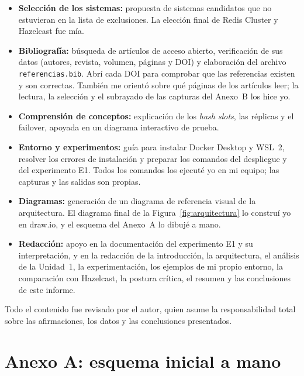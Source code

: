 \documentclass[11pt,a4paper]{article}
\begin{document}
\begin{itemize}
  \item \textbf{Selección de los sistemas:} propuesta de sistemas candidatos
  que no estuvieran en la lista de exclusiones. La elección final de Redis
  Cluster y Hazelcast fue mía.
  \item \textbf{Bibliografía:} búsqueda de artículos de acceso abierto,
  verificación de sus datos (autores, revista, volumen, páginas y DOI) y
  elaboración del archivo \texttt{referencias.bib}. Abrí cada DOI para
  comprobar que las referencias existen y son correctas. También me orientó
  sobre qué páginas de los artículos leer; la lectura, la selección y el
  subrayado de las capturas del Anexo~B los hice yo.
  \item \textbf{Comprensión de conceptos:} explicación de los \emph{hash
  slots}, las réplicas y el failover, apoyada en un diagrama interactivo de
  prueba.
  \item \textbf{Entorno y experimentos:} guía para instalar Docker Desktop y
  WSL~2, resolver los errores de instalación y preparar los comandos del
  despliegue y del experimento E1. Todos los comandos los ejecuté yo en mi
  equipo; las capturas y las salidas son propias.
  \item \textbf{Diagramas:} generación de un diagrama de referencia visual
  de la arquitectura. El diagrama final de la Figura~\ref{fig:arquitectura}
  lo construí yo en draw.io, y el esquema del Anexo~A lo dibujé a mano.
  \item \textbf{Redacción:} apoyo en la documentación del experimento E1 y su
  interpretación, y en la redacción de la introducción, la arquitectura, el
  análisis de la Unidad~1, la experimentación, los ejemplos de mi propio
  entorno, la comparación con Hazelcast, la postura crítica, el resumen y
  las conclusiones de este informe.
\end{itemize}

Todo el contenido fue revisado por el autor, quien asume la responsabilidad
total sobre las afirmaciones, los datos y las conclusiones presentados.

\printbibliography[heading=bibintoc, title={Referencias}]

\appendix
\section{Anexo A: esquema inicial a mano}
\end{document}
